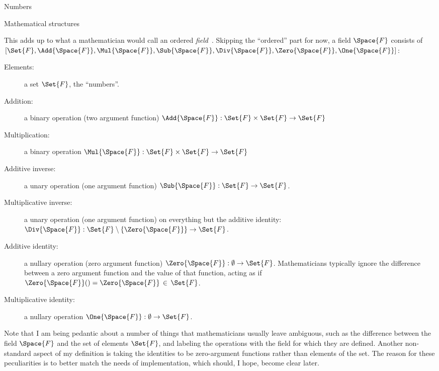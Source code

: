 \documentclass[12pt]{PalisadesLakesBook}
\begin{document}
\begin{plSection}{Numbers} 


\end{plSection}%
\begin{plSection}{Mathematical structures} 


This adds up to what a mathematician would call an ordered 
\emph{field}~\cite{wiki:FieldMathematics}.
Skipping the ``ordered'' part for now,
a field $\Space{F}$ consists of
$[\Set{F},\Add{\Space{F}},\Mul{\Space{F}},
\Sub{\Space{F}},\Div{\Space{F}},\Zero{\Space{F}}, \One{\Space{F}}]$:
\begin{description}
\item[Elements:] a set $\Set{F}$, the ``numbers''.
\item[Addition:] a binary operation (two argument function)
$\Add{\Space{F}} : \Set{F} \times \Set{F} \rightarrow \Set{F}$
\item[Multiplication:] a binary operation 
$\Mul{\Space{F}} : \Set{F} \times \Set{F} \rightarrow \Set{F}$
\item[Additive inverse:] a unary operation (one argument function)
$\Sub{\Space{F}} :\Set{F} \rightarrow \Set{F}$.
\item[Multiplicative inverse:] 
a unary operation (one argument function)
on everything but the additive identity:
$\Div{\Space{F}} :  \Set{F} \setminus \left\{\Zero{\Space{F}}\right\} 
\rightarrow \Set{F}$.
\item[Additive identity:] a nullary operation 
(zero argument function)
$\Zero{\Space{F}} : \emptyset \rightarrow \Set{F}$.
Mathematicians typically ignore the difference between a zero
argument function and the value of that function,
acting as if $\Zero{\Space{F}}() = \Zero{\Space{F}}\, \in \, \Set{F}$.
\item[Multiplicative identity:] a nullary operation 
$\One{\Space{F}} : \emptyset \rightarrow \Set{F}$.
\end{description}
Note that I am being pedantic about a number of things
that mathematicians usually leave ambiguous,
such as the difference between the field $\Space{F}$ 
and the set of elements $\Set{F}$,
and labeling the operations
with the field for which they are defined.
Another non-standard aspect of my definition is taking
the identities to be zero-argument functions rather than
elements of the set.
The reason for these peculiarities is to better match the needs 
of implementation, which should, I hope, 
become clear later.


\end{plSection}
\end{document}
